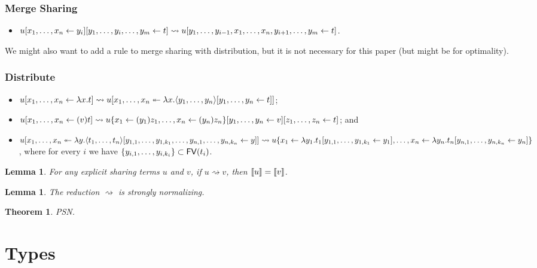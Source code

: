 \documentclass[10pt,a4paper]{article}
\theoremstyle{definition}
\theoremstyle{plain}
\newtheorem{lemma}[definition]{Lemma}
\newtheorem{theorem}[definition]{Theorem}
\theoremstyle{remark}
\begin{document}
\subsubsection{Merge Sharing}

\begin{itemize}
 \item ${ {{ { {u}[{{x_1},\dots,{x_n}}\leftarrow{y_i}] } }}[{y_1,\dots,y_i,\dots,y_m}\leftarrow{t}] }\rightsquigarrow
	{ {u}[{y_1,\dots,y_{i-1},x_1,\dots,x_n,y_{i+1},\dots,y_m}\leftarrow{t}] }$.
\end{itemize}

We might also want to add a rule to merge sharing with distribution, but it is not necessary for this paper (but might be for optimality).

\subsubsection{Distribute}

\begin{itemize}
 \item ${ { {u}[{{x_1},\dots,{x_n}}\leftarrow{\lambda x.t}] } } \rightsquigarrow {  { {u}[{{x_1},\dots,{x_n}}\twoheadleftarrow{\lambda{x}.{ {  { { { {\langle} {y_1},\dots,{y_n} {\rangle} } }[{{y_1},\dots,{y_n}}\leftarrow{t}] }  } }}] }  }$;
 \item ${ { {u}[{{x_1},\dots,{x_n}}\leftarrow{(v)t}] } } \rightsquigarrow {  { { {  { {{{u}\{{x_1}\leftarrow{(y_1)z_1},\dots,{x_n}\leftarrow{(y_n)z_n}\}}}[{{y_1},\dots,{y_n}}\leftarrow{v}] }  } }[{{z_1},\dots,{z_n}}\leftarrow{t}] }  }$; and
 \item ${ { {u}[{{x_1},\dots,{x_n}}\twoheadleftarrow{\lambda{y}.{ { { { {\langle} {t_1},\dots,{t_n} {\rangle} } }[{y_{1,1},\dots,y_{1,k_1},\dots,y_{n,1},\dots,y_{n,k_n}}\leftarrow{y}] } }}] } }\rightsquigarrow {{u}\{{x_1}\leftarrow{\lambda y_1. {  { {t_1}[{{y_{1,1}},\dots,{y_{1,k_1}}}\leftarrow{y_1}] }  } },\dots,{x_n}\leftarrow{\lambda y_n. {  { {t_n}[{{y_{n,1}},\dots,{y_{n,k_n}}}\leftarrow{y_n}] }  } }\}}$, where for every $i$ we have $\{y_{i,1},\dots,y_{i,k_i}\}\subset{\mathop{\mathsf{FV}}}(t_i)$.
\end{itemize}

\begin{lemma}
For any explicit sharing terms $u$ and $v$, if $u\rightsquigarrow v$, then ${\llbracket{u}\rrbracket}={\llbracket{v}\rrbracket}$.
\end{lemma}

\begin{lemma}
The reduction $\rightsquigarrow$ is strongly normalizing.
\end{lemma}

\begin{theorem}
PSN.
\end{theorem}

\section{Types}
\end{document}
